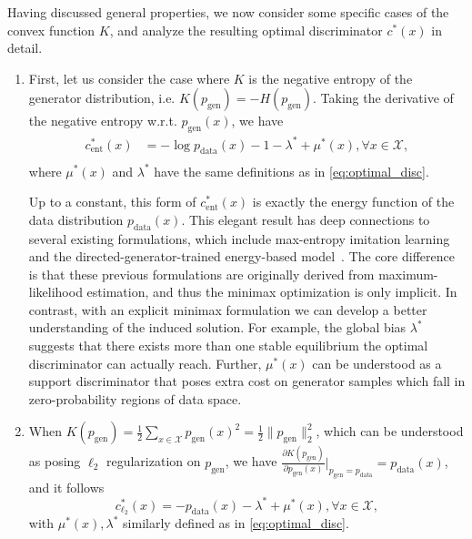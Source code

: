 \documentclass[a4paper]{article}
\newcommand{\pd}{p_\text{data}}
\newcommand{\pg}{p_\text{gen}}
\begin{document}
Having discussed general properties, we now consider some specific cases of the convex function $K$, and analyze the resulting optimal discriminator $c^*(x)$ in detail.
\begin{enumerate}[leftmargin=16pt,labelindent=16pt]
\item First, let us consider the case where $K$ is the negative entropy of the generator distribution, i.e. $K(\pg) = -H(\pg)$. 
Taking the derivative of the negative entropy w.r.t. $\pg(x)$, we have 
\begin{equation}
\label{eq:optimal_disc_entropy}
\begin{aligned}
	c_\text{ent}^*(x) &= -\log \pd(x) - 1 - \lambda^* + \mu^*(x), \forall x \in \mathcal{X}, \\
\end{aligned}
\end{equation}
where $\mu^*(x)$ and $\lambda^*$ have the same definitions as in \eqref{eq:optimal_disc}.

Up to a constant, this form of $c_\text{ent}^*(x)$ is exactly the energy function of the data distribution $\pd(x)$.
This elegant result has deep connections to several existing formulations, which include max-entropy imitation learning~\citep{ziebart2008maximum} and the directed-generator-trained energy-based model~\citep{kim2016deep}.
The core difference is that these previous formulations are originally derived from maximum-likelihood estimation, and thus the minimax optimization is only implicit.
In contrast, with an explicit minimax formulation we can develop a better understanding of the induced solution.
For example, the global bias $\lambda^*$ suggests that there exists more than one stable equilibrium the optimal discriminator can actually reach.
Further, $\mu^*(x)$ can be understood as a support discriminator that poses extra cost on generator samples which fall in zero-probability regions of data space.


\item When $K(\pg) = \frac{1}{2}\sum_{x \in \mathcal{X}} \pg(x)^2 = \frac{1}{2}\|\pg\|_2^2$, which can be understood as posing $\ell_2$ regularization on $\pg$, we have $\frac{\partial K(\pg)}{\partial \pg(x)}\big|_{\pg=\pd} = \pd(x)$, and it follows
\begin{equation}
\label{eq:optimal_disc_l2}
	c_{\ell_2}^*(x) = - \pd(x) - \lambda^* + \mu^*(x), \forall x \in \mathcal{X},
\end{equation}
with $\mu^*(x), \lambda^*$ similarly defined as in \eqref{eq:optimal_disc}.


\end{enumerate}
\end{document}
